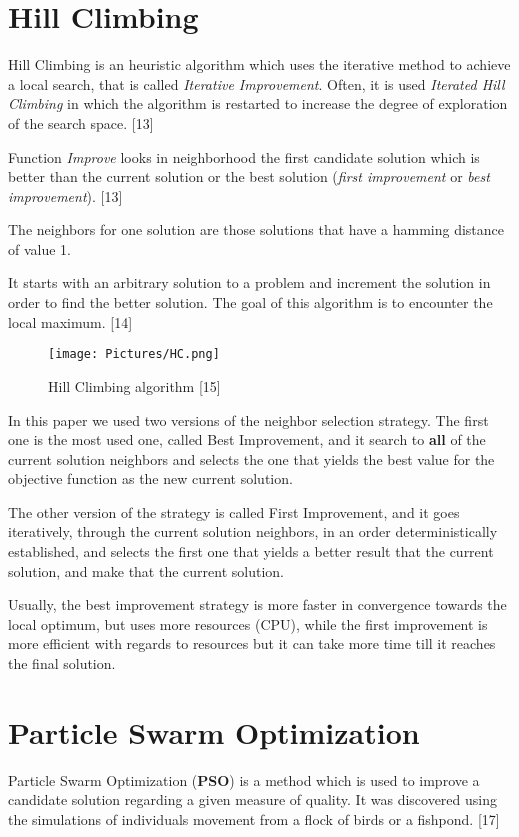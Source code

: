 \section{Hill Climbing}
Hill Climbing is an heuristic algorithm which uses the iterative method to achieve a local search, that is called \textit{Iterative Improvement}. Often, it is used \textit{Iterated Hill Climbing} in which the algorithm is restarted to increase the degree of exploration of the search space. [13]

Function \textit{Improve} looks in neighborhood the first candidate solution which is better than the current solution or the best solution (\textit{first improvement} or \textit{best improvement}). [13]

The neighbors for one solution are those solutions that have a hamming distance of value 1.

It starts with an arbitrary solution to a problem and increment the solution in order to find the better solution. The goal of this algorithm is to encounter the local maximum. [14]

\begin{figure}
	\texttt{[image: Pictures/HC.png]}
	\caption{ Hill Climbing algorithm [15]}
	\label{Hill Climbing algorithmvEx}
\end{figure}

In this paper we used two versions of the neighbor selection strategy. The first one is the most used one, called Best Improvement, and it search to \textbf{all} of the current solution neighbors and selects the one that yields the best value for the objective function as the new current solution.

The other version of the strategy is called First Improvement, and it goes iteratively, through the current solution neighbors, in an order deterministically established, and selects the first one that yields a better result that the current solution, and make that the current solution.

Usually, the best improvement strategy is more faster in convergence towards the local optimum, but uses more resources (CPU), while the first improvement is more efficient with regards to resources but it can take more time till it reaches the final solution.


\section{Particle Swarm Optimization}
Particle Swarm Optimization \big(\textbf{PSO}\big) is a method which is used to improve a candidate solution regarding a given measure of quality. It was discovered using the simulations of individuals movement from a flock of birds or a fishpond. [17]


